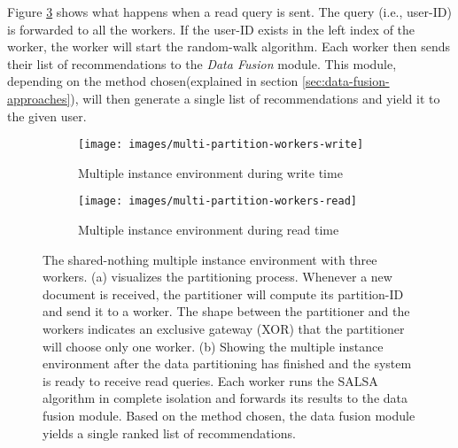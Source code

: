 Figure \ref{fig:multiple-machine-architecture-read} shows what happens when a read query is sent. The query (i.e., user-ID) is forwarded to all the workers. If the user-ID exists in the left index of the worker, the worker will start the random-walk algorithm. Each worker then sends their list of recommendations to the \emph{Data Fusion} module. This module, depending on the method chosen(explained in section \ref{sec:data-fusion-approaches}), will then generate a single list of recommendations and yield it to the given user.



\begin{figure}[!htb]
    \centering
    \begin{subfigure}[b]{0.75\textwidth}
        \centering
        \texttt{[image: images/multi-partition-workers-write]}
        \caption{Multiple instance environment during write time}
        \label{fig:multiple-machine-architecture-write}
    \end{subfigure}
    
    \begin{subfigure}[b]{1\textwidth}
        \centering
        \texttt{[image: images/multi-partition-workers-read]}
        \caption{Multiple instance environment during read time}
        \label{fig:multiple-machine-architecture-read}
    \end{subfigure}
    
    \caption {The shared-nothing multiple instance environment with three workers. (a) visualizes the partitioning process. Whenever a new document is received, the partitioner will compute its partition-ID and send it to a worker. The shape between the partitioner and the workers indicates an exclusive gateway (XOR) that the partitioner will choose only one worker. (b) Showing the multiple instance environment after the data partitioning has finished and the system is ready to receive read queries. Each worker runs the SALSA algorithm in complete isolation and forwards its results to the data fusion module. Based on the method chosen, the data fusion module yields a single ranked list of recommendations.}
\end{figure}
